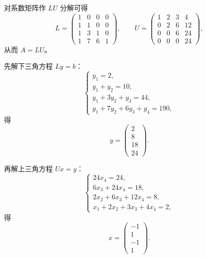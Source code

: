 \documentclass[11pt, a4paper]{ctexart}
\begin{document}
\begin{solution}
    对系数矩阵作 $LU$ 分解可得
    \[
        L =
        \begin{pmatrix}
            1 & 0 & 0 & 0 \\
            1 & 1 & 0 & 0 \\
            1 & 3 & 1 & 0 \\
            1 & 7 & 6 & 1
        \end{pmatrix},
        \qquad
        U =
        \begin{pmatrix}
            1 & 2 & 3 & 4 \\
            0 & 2 & 6 & 12 \\
            0 & 0 & 6 & 24 \\
            0 & 0 & 0 & 24
        \end{pmatrix},
    \]
    从而 $A = LU$。

    先解下三角方程 $Ly = b$：
    \[
        \begin{cases}
            y_1 = 2, \\
            y_1 + y_2 = 10, \\
            y_1 + 3y_2 + y_3 = 44, \\
            y_1 + 7y_2 + 6y_3 + y_4 = 190,
        \end{cases}
    \]
    得
    \[
        y =
        \begin{pmatrix}
            2 \\
            8 \\
            18 \\
            24
        \end{pmatrix}.
    \]

    再解上三角方程 $Ux = y$：
    \[
        \begin{cases}
            24x_4 = 24, \\
            6x_3 + 24x_4 = 18, \\
            2x_2 + 6x_3 + 12x_4 = 8, \\
            x_1 + 2x_2 + 3x_3 + 4x_4 = 2,
        \end{cases}
    \]
    得
    \[
        x =
        \begin{pmatrix}
            -1 \\
            1 \\
            -1 \\
            1
        \end{pmatrix}.
    \]
\end{solution}
\end{document}
